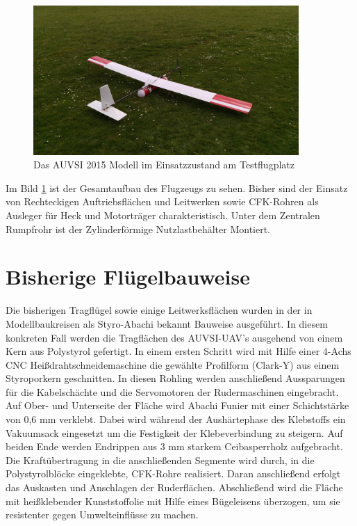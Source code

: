 \begin{figure}[H]
\centering
\includegraphics[width=0.9\textwidth]{bilder/Fotos/AUVSI_2015.jpg} 
\caption{Das AUVSI 2015 Modell im Einsatzzustand am Testflugplatz} 
\label{fig:Das AUVSI 2015 Modell in Einsatzzustand am Testflugplatz}
\end{figure}

Im Bild \ref{fig:Das AUVSI 2015 Modell in Einsatzzustand am Testflugplatz} ist der Gesamtaufbau des Flugzeugs zu sehen. Bisher sind der Einsatz von Rechteckigen Auftriebsflächen und Leitwerken sowie CFK-Rohren als Ausleger für Heck und Motorträger charakteristisch. Unter dem Zentralen Rumpfrohr ist der Zylinderförmige Nutzlastbehälter Montiert.


\clearpage


\section{Bisherige Flügelbauweise}

Die bisherigen Tragflügel sowie einige Leitwerksflächen wurden in der in Modellbaukreisen als \glqq Styro-Abachi\glqq{}  bekannt Bauweise ausgeführt. In diesem konkreten Fall werden die Tragflächen des AUVSI-UAV's ausgehend von einem Kern aus Polystyrol gefertigt. In einem ersten Schritt wird mit Hilfe einer 4-Achs CNC Heißdrahtschneidemaschine die gewählte Profilform (Clark-Y) aus einem Styroporkern geschnitten. In diesen Rohling werden anschließend Aussparungen für die Kabelschächte und die Servomotoren der Rudermaschinen eingebracht. Auf Ober- und Unterseite der Fläche wird Abachi Funier mit einer Schichtstärke von 0,6 mm verklebt. Dabei wird während der Aushärtephase des Klebstoffs ein Vakuumsack eingesetzt um die Festigkeit der Klebeverbindung zu steigern.
Auf beiden Ende werden Endrippen aus 3 mm starkem Ceibasperrholz aufgebracht. Die Kraftübertragung in die anschließenden Segmente wird durch, in die Polystyrolblöcke eingeklebte, CFK-Rohre realisiert. Daran anschließend erfolgt das Auskasten und Anschlagen der Ruderflächen.
Abschließend wird die Fläche mit heißklebender Kunststoffolie mit Hilfe eines Bügeleisens überzogen, um sie resistenter gegen Umwelteinflüsse zu machen.

